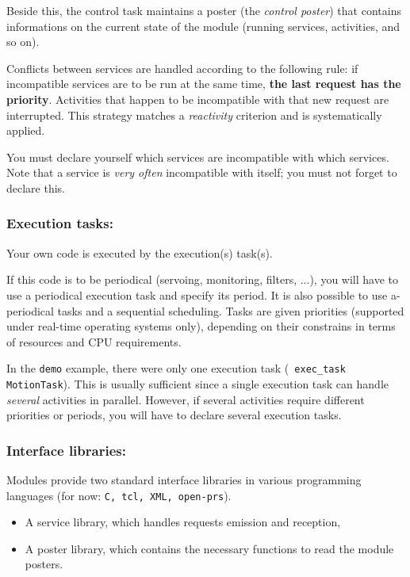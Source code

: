 Beside    this, the control task  maintains   a poster  (the {\em control
poster}) that contains informations on   the current state of the  module
(running services, activities, and so on).

Conflicts between services are   handled  according to the following  rule:  if
incompatible  services are to  be run  at the  same  time, {\bf  the last
request   has  the  priority}. Activities    that  happen to  be
incompatible  with that new request are  interrupted. This strategy matches a
{\em reactivity} criterion and is systematically applied.

You must  declare  yourself which  services  are incompatible with  which
services. Note that   a service is  {\em  very often}  incompatible  with
itself; you must not forget to declare this.


\subsubsection{Execution tasks:}

Your own code is executed by the execution(s) task(s).

If  this code is to  be periodical (servoing,  monitoring, filters, ...),
you will have to use a periodical  execution task and specify its period.
It   is  also  possible   to use   a-periodical  tasks  and  a  sequential
scheduling. Tasks are  given priorities (supported under real-time
operating systems only),
depending on their constrains in terms of resources and CPU requirements.

In the  {\tt  demo} example,  there were  only one  execution  task ({\tt
exec\_task MotionTask}). This   is  usually  sufficient since  a   single
execution task can handle {\em several}  activities in parallel. However,
if several  activities require different  priorities or periods, you will
have to declare several execution tasks.


\subsubsection{Interface libraries:}

Modules provide two standard interface libraries in various programming
languages (for now: {\tt C, tcl, XML, open-prs}).

\begin{itemize}
\item A service library, which handles requests emission and reception,
\item A poster library, which contains the necessary functions to read
the module posters.
\end{itemize}


